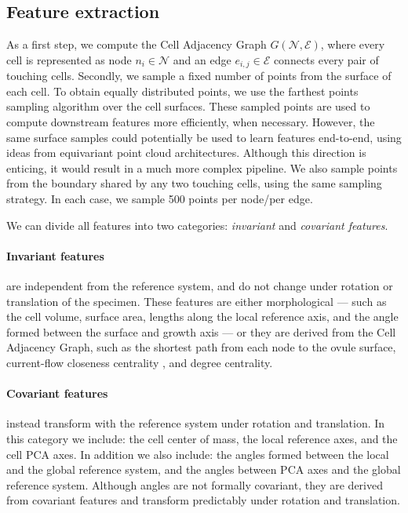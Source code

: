 \documentclass[10pt,twocolumn,letterpaper]{article}
\begin{document}
\subsection{Feature extraction}
\label{subsec:basic-feat}
As a first step, we compute the Cell Adjacency Graph $G\left( \mathcal{N}, \mathcal{E} \right)$, where every cell is represented as node $n_i \in \mathcal{N}$ and an edge $e_{i,j} \in \mathcal{E}$ connects every pair of touching cells.
Secondly, we sample a fixed number of points from the surface of each cell. To obtain equally distributed points, we use the farthest points sampling algorithm \cite{qi2017pointnet++} over the cell surfaces.
These sampled points are used to compute downstream features more efficiently, when necessary. However, the same surface samples could potentially be used to learn features end-to-end, using ideas from equivariant point cloud architectures. Although this direction is enticing, it would result in a much more complex pipeline.
We also sample points from the boundary shared by any two touching cells, using the same sampling strategy. In each case, we sample 500 points per node/per edge.

We can divide all features into two categories: \textit{invariant} and \textit{covariant features}.
\paragraph{Invariant features} are independent from the reference system, and do not change under rotation or translation of the specimen. These features are either morphological --- such as the cell volume, surface area, lengths along the local reference axis, and the angle formed between the surface and growth axis --- or they are derived from the Cell Adjacency Graph, such as the shortest path from each node to the ovule surface, current-flow closeness centrality \cite{stephenson1989rethinking}, and degree centrality.
\paragraph{Covariant features} instead transform with the reference system under rotation and translation. In this category we include: the cell center of mass, the local reference axes, and the cell PCA axes. In addition we also include: the angles formed between the local and the global reference system, and the angles between PCA axes and the global reference system. Although angles are not formally covariant, they are derived from covariant features and transform predictably under rotation and translation.
\end{document}
